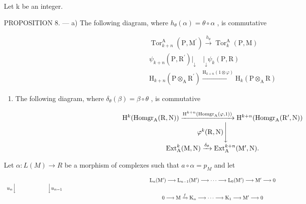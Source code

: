 Let k be an integer.

PROPOSITION 8. --- a) The following diagram, where \(h_{\theta}(\alpha) = \theta \circ \alpha\) , is commutative

\[
\begin{array}{c} \operatorname{Tor} _ {k + n} ^ {\mathrm{A}} (\mathrm{P}, \mathrm{M} ^ {\prime}) \xrightarrow {h _ {\theta}} \operatorname{Tor} _ {k} ^ {\mathrm{A}} (\mathrm{P}, \mathrm{M}) \\ \psi_ {k + n} (\mathrm{P}, \mathrm{R} ^ {\prime}) \Big | _ {\downarrow} \quad \Big | _ {\downarrow} \psi_ {k} (\mathrm{P}, \mathrm{R}) \\ \mathrm{H} _ {k + n} (\mathrm{P} \otimes_ {\mathrm{A}} \mathrm{R} ^ {\prime}) \xrightarrow {\mathrm{H} _ {k + n} (1 \otimes \varphi)} \mathrm{H} _ {k} (\mathrm{P} \otimes_ {\mathrm{A}} \mathrm{R}) \end{array}
\]

\begin{enumerate}
\def\labelenumi{\alph{enumi})}
\setcounter{enumi}{1}
\tightlist
\item
  The following diagram, where \(\delta_{\theta}(\beta) = \beta \circ \theta\) , is commutative
\end{enumerate}

\[
\begin{array}{c} \mathrm{H} ^ {k} (\text {Homgr} _ {\mathrm{A}} (\mathrm{R}, \mathrm{N})) \xrightarrow {\mathrm{H} ^ {k + n} (\text {Homgr} _ {\mathrm{A}} (\varphi , 1))} \mathrm{H} ^ {k + n} (\text {Homgr} _ {\mathrm{A}} (\mathrm{R} ^ {\prime}, \mathrm{N})) \\ \varphi^ {k} (\mathrm{R}, \mathrm{N}) \Biggl \downarrow \\ \operatorname{Ext} _ {\mathrm{A}} ^ {k} (\mathrm{M}, \mathrm{N}) \xrightarrow {\delta_ {\theta}} \operatorname{Ext} _ {\mathrm{A}} ^ {k + n} (\mathrm{M} ^ {\prime}, \mathrm{N}). \end{array}
\]

Let \(\alpha : L(M) \to R\) be a morphism of complexes such that \(a \circ \alpha = p_{M}\) and let

\[
\begin{array}{c} \mathrm{L} _ {n} (\mathrm{M} ^ {\prime}) \longrightarrow \mathrm{L} _ {n - 1} (\mathrm{M} ^ {\prime}) \longrightarrow \dots \longrightarrow \mathrm{L} _ {0} (\mathrm{M} ^ {\prime}) \longrightarrow \mathrm{M} ^ {\prime} \longrightarrow 0 \\ u _ {n} \Big \downarrow \qquad \qquad \qquad \Big \downarrow u _ {n - 1} \qquad \qquad \qquad \qquad \qquad \qquad \qquad \qquad \qquad \qquad \qquad \qquad \qquad \qquad \qquad \qquad \qquad \qquad \qquad \qquad \qquad \qquad \qquad \qquad \qquad \qquad \qquad \qquad \qquad \qquad \qquad \qquad \qquad \qquad \\ 0 \longrightarrow \mathrm{M} \xrightarrow {f} \mathrm{K} _ {n} \longrightarrow \dots \longrightarrow \mathrm{K} _ {1} \longrightarrow \mathrm{M} ^ {\prime} \longrightarrow 0 \end{array}
\]

